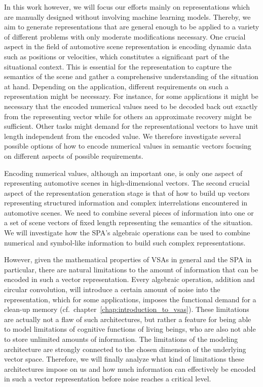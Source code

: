 In this work however, we will focus our efforts mainly on representations which are manually designed without involving machine learning models.
Thereby, we aim to generate representations that are general enough to be applied to a variety of different problems with only moderate modifications necessary.
One crucial aspect in the field of automotive scene representation is encoding dynamic data such as positions or velocities, which constitutes a significant part of the situational context.
This is essential for the representation to capture the semantics of the scene and gather a comprehensive understanding of the situation at hand.
Depending on the application, different requirements on such a representation might be necessary.
For instance, for some applications it might be necessary that the encoded numerical values need to be decoded back out exactly from the representing vector while for others an approximate recovery might be sufficient.
Other tasks might demand for the representational vectors to have unit length independent from the encoded value.
We therefore investigate several possible options of how to encode numerical values in semantic vectors focusing on different aspects of possible requirements.

Encoding numerical values, although an important one, is only one aspect of representing automotive scenes in high-dimensional vectors.
The second crucial aspect of the representation generation stage is that of how to build up vectors representing structured information and complex interrelations encountered in automotive scenes.
We need to combine several pieces of information into one or a set of scene vectors of fixed length representing the semantics of the situation.
We will investigate how the \ac{SPA}'s algebraic operations can be used to combine numerical and symbol-like information to build such complex representations.

However, given the mathematical properties of \acp{VSA} in general and the \ac{SPA} in particular, there are natural limitations to the amount of information that can be encoded in such a vector representation.
Every algebraic operation, addition and circular convolution, will introduce a certain amount of noise into the representation, which for some applications, imposes the functional demand for a clean-up memory (cf.\ chapter~\ref{chap:introduction_to_vsas}).
These limitations are actually not a flaw of such architectures, but rather a feature for being able to model limitations of cognitive functions of living beings, who are also not able to store unlimited amounts of information.
The limitations of the modeling architecture are strongly connected to the chosen dimension of the underlying vector space.
Therefore, we will finally analyze what kind of limitations these architectures impose on us and how much information can effectively be encoded in such a vector representation before noise reaches a critical level.

